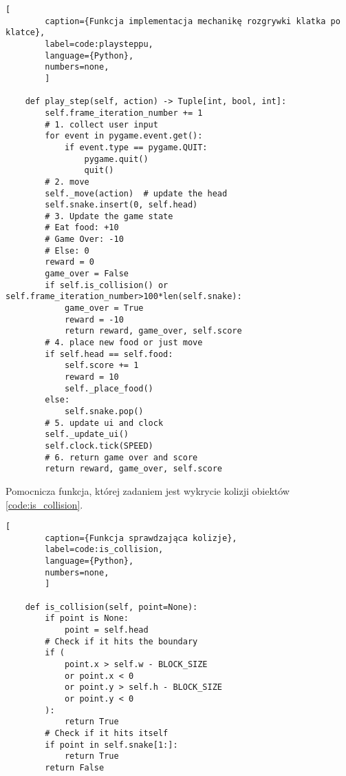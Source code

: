 \begin{onepage}
    \begin{lstlisting}[
        caption={Funkcja implementacja mechanikę rozgrywki klatka po klatce},
        label=code:playsteppu,
        language={Python},
        numbers=none,
        ]

    def play_step(self, action) -> Tuple[int, bool, int]:
        self.frame_iteration_number += 1
        # 1. collect user input
        for event in pygame.event.get():
            if event.type == pygame.QUIT:
                pygame.quit()
                quit()
        # 2. move
        self._move(action)  # update the head
        self.snake.insert(0, self.head)
        # 3. Update the game state
        # Eat food: +10
        # Game Over: -10
        # Else: 0
        reward = 0
        game_over = False
        if self.is_collision() or self.frame_iteration_number>100*len(self.snake):
            game_over = True
            reward = -10
            return reward, game_over, self.score
        # 4. place new food or just move
        if self.head == self.food:
            self.score += 1
            reward = 10
            self._place_food()
        else:
            self.snake.pop()
        # 5. update ui and clock
        self._update_ui()
        self.clock.tick(SPEED)
        # 6. return game over and score
        return reward, game_over, self.score
    \end{lstlisting}
\end{onepage}

\clearpage

Pomocnicza funkcja, której zadaniem jest wykrycie kolizji obiektów \ref{code:is_collision}.


\begin{onepage}
    \begin{lstlisting}[
        caption={Funkcja sprawdzająca kolizje},
        label=code:is_collision,
        language={Python},
        numbers=none,
        ]

    def is_collision(self, point=None):
        if point is None:
            point = self.head
        # Check if it hits the boundary
        if (
            point.x > self.w - BLOCK_SIZE
            or point.x < 0
            or point.y > self.h - BLOCK_SIZE
            or point.y < 0
        ):
            return True
        # Check if it hits itself
        if point in self.snake[1:]:
            return True
        return False
    \end{lstlisting}
\end{onepage}

